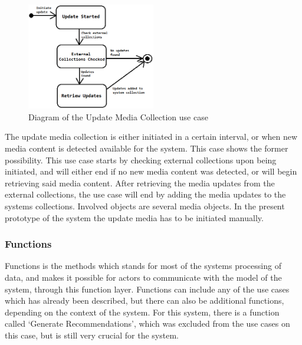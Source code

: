 \begin{figure}[htb]
\centering
\includegraphics[width=0.5\textwidth]{Images/UpdateCollection.png}
\caption{Diagram of the Update Media Collection use case}
\label{UpdateCollection}
\end{figure}

The update media collection is either initiated in a certain interval, or when new media content is detected available for the system. This case shows the former possibility. This use case starts by checking external collections upon being initiated, and will either end if no new media content was detected, or will begin retrieving said media content. After retrieving the media updates from the external collections, the use case will end by adding the media updates to the systems collections. Involved objects are several media objects. In the present prototype of the system the update media has to be initiated manually.

\subsubsection{Functions}

Functions is the methods which stands for most of the systems processing of data, and makes it possible for actors to communicate with the model of the system, through this function layer. Functions can include any of the use cases which has already been described, but there can also be additional functions, depending on the context of the system. For this system, there is a function called ‘Generate Recommendations’, which was excluded from the use cases on this case, but is still very crucial for the system. 

